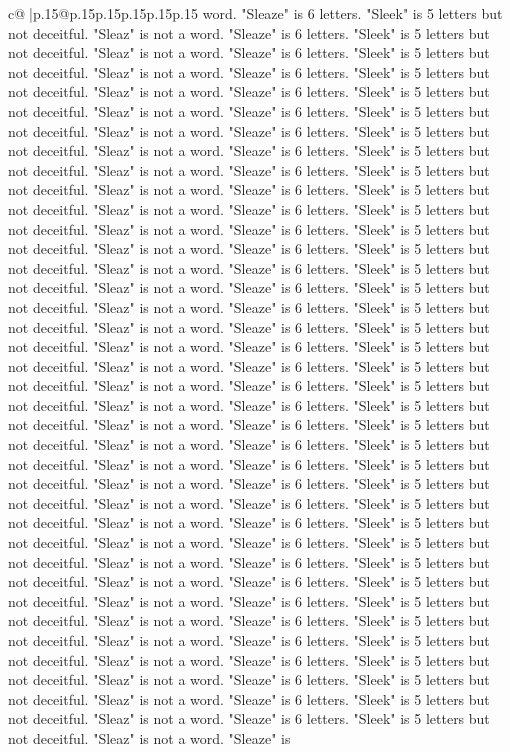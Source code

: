 \documentclass{article}
\begin{document}
{\begin{supertabular}{c@{$\;$}|p{.15\linewidth}@{}p{.15\linewidth}p{.15\linewidth}p{.15\linewidth}p{.15\linewidth}p{.15\linewidth}}
{{{word. "Sleaze" is 6 letters. "Sleek" is 5 letters but not deceitful. "Sleaz" is not a word. "Sleaze" is 6 letters. "Sleek" is 5 letters but not deceitful. "Sleaz" is not a word. "Sleaze" is 6 letters. "Sleek" is 5 letters but not deceitful. "Sleaz" is not a word. "Sleaze" is 6 letters. "Sleek" is 5 letters but not deceitful. "Sleaz" is not a word. "Sleaze" is 6 letters. "Sleek" is 5 letters but not deceitful. "Sleaz" is not a word. "Sleaze" is 6 letters. "Sleek" is 5 letters but not deceitful. "Sleaz" is not a word. "Sleaze" is 6 letters. "Sleek" is 5 letters but not deceitful. "Sleaz" is not a word. "Sleaze" is 6 letters. "Sleek" is 5 letters but not deceitful. "Sleaz" is not a word. "Sleaze" is 6 letters. "Sleek" is 5 letters but not deceitful. "Sleaz" is not a word. "Sleaze" is 6 letters. "Sleek" is 5 letters but not deceitful. "Sleaz" is not a word. "Sleaze" is 6 letters. "Sleek" is 5 letters but not deceitful. "Sleaz" is not a word. "Sleaze" is 6 letters. "Sleek" is 5 letters but not deceitful. "Sleaz" is not a word. "Sleaze" is 6 letters. "Sleek" is 5 letters but not deceitful. "Sleaz" is not a word. "Sleaze" is 6 letters. "Sleek" is 5 letters but not deceitful. "Sleaz" is not a word. "Sleaze" is 6 letters. "Sleek" is 5 letters but not deceitful. "Sleaz" is not a word. "Sleaze" is 6 letters. "Sleek" is 5 letters but not deceitful. "Sleaz" is not a word. "Sleaze" is 6 letters. "Sleek" is 5 letters but not deceitful. "Sleaz" is not a word. "Sleaze" is 6 letters. "Sleek" is 5 letters but not deceitful. "Sleaz" is not a word. "Sleaze" is 6 letters. "Sleek" is 5 letters but not deceitful. "Sleaz" is not a word. "Sleaze" is 6 letters. "Sleek" is 5 letters but not deceitful. "Sleaz" is not a word. "Sleaze" is 6 letters. "Sleek" is 5 letters but not deceitful. "Sleaz" is not a word. "Sleaze" is 6 letters. "Sleek" is 5 letters but not deceitful. "Sleaz" is not a word. "Sleaze" is 6 letters. "Sleek" is 5 letters but not deceitful. "Sleaz" is not a word. "Sleaze" is 6 letters. "Sleek" is 5 letters but not deceitful. "Sleaz" is not a word. "Sleaze" is 6 letters. "Sleek" is 5 letters but not deceitful. "Sleaz" is not a word. "Sleaze" is 6 letters. "Sleek" is 5 letters but not deceitful. "Sleaz" is not a word. "Sleaze" is 6 letters. "Sleek" is 5 letters but not deceitful. "Sleaz" is not a word. "Sleaze" is 6 letters. "Sleek" is 5 letters but not deceitful. "Sleaz" is not a word. "Sleaze" is 6 letters. "Sleek" is 5 letters but not deceitful. "Sleaz" is not a word. "Sleaze" is 6 letters. "Sleek" is 5 letters but not deceitful. "Sleaz" is not a word. "Sleaze" is 6 letters. "Sleek" is 5 letters but not deceitful. "Sleaz" is not a word. "Sleaze" is 6 letters. "Sleek" is 5 letters but not deceitful. "Sleaz" is not a word. "Sleaze" is 6 letters. "Sleek" is 5 letters but not deceitful. "Sleaz" is not a word. "Sleaze" is 6 letters. "Sleek" is 5 letters but not deceitful. "Sleaz" is not a word. "Sleaze" is 6 letters. "Sleek" is 5 letters but not deceitful. "Sleaz" is not a word. "Sleaze" is 6 letters. "Sleek" is 5 letters but not deceitful. "Sleaz" is not a word. "Sleaze" is 6 letters. "Sleek" is 5 letters but not deceitful. "Sleaz" is not a word. "Sleaze" is }}}
\end{supertabular}}
\end{document}
